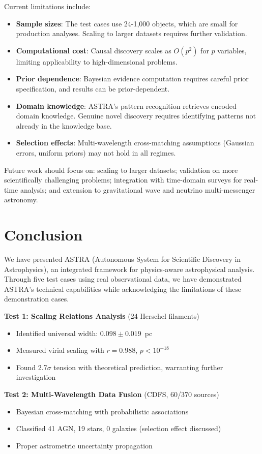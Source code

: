 \documentclass[usenatbib]{rasti}
\begin{document}
Current limitations include:
\begin{itemize}
\item \textbf{Sample sizes}: The test cases use 24-1,000 objects, which are small for production analyses. Scaling to larger datasets requires further validation.
\item \textbf{Computational cost}: Causal discovery scales as $O(p^2)$ for $p$ variables, limiting applicability to high-dimensional problems.
\item \textbf{Prior dependence}: Bayesian evidence computation requires careful prior specification, and results can be prior-dependent.
\item \textbf{Domain knowledge}: ASTRA's pattern recognition retrieves encoded domain knowledge. Genuine novel discovery requires identifying patterns not already in the knowledge base.
\item \textbf{Selection effects}: Multi-wavelength cross-matching assumptions (Gaussian errors, uniform priors) may not hold in all regimes.
\end{itemize}

Future work should focus on: scaling to larger datasets; validation on more scientifically challenging problems; integration with time-domain surveys for real-time analysis; and extension to gravitational wave and neutrino multi-messenger astronomy.

\section{Conclusion}

We have presented ASTRA (Autonomous System for Scientific Discovery in Astrophysics), an integrated framework for physics-aware astrophysical analysis. Through five test cases using real observational data, we have demonstrated ASTRA's technical capabilities while acknowledging the limitations of these demonstration cases.

\textbf{Test 1: Scaling Relations Analysis} (24 Herschel filaments)
\begin{itemize}
\item Identified universal width: $0.098 \pm 0.019$~pc
\item Measured virial scaling with $r = 0.988$, $p < 10^{-18}$
\item Found 2.7$\sigma$ tension with theoretical prediction, warranting further investigation
\end{itemize}

\textbf{Test 2: Multi-Wavelength Data Fusion} (CDFS, 60/370 sources)
\begin{itemize}
\item Bayesian cross-matching with probabilistic associations
\item Classified 41 AGN, 19 stars, 0 galaxies (selection effect discussed)
\item Proper astrometric uncertainty propagation
\end{itemize}
\end{document}

